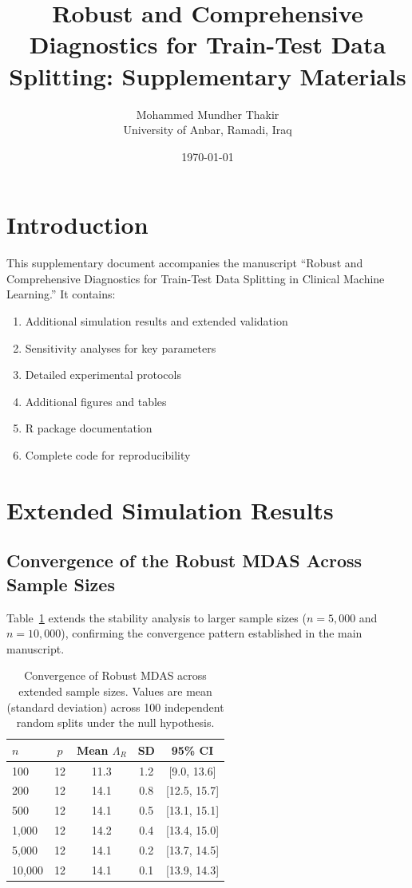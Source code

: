 \documentclass[10pt,a4paper]{article}
\title{Robust and Comprehensive Diagnostics for Train-Test Data Splitting: Supplementary Materials}
\author{Mohammed Mundher Thakir\\ \small{University of Anbar, Ramadi, Iraq}}
\date{\today}
\begin{document}
\maketitle

\tableofcontents

\newpage

\section{Introduction}

This supplementary document accompanies the manuscript ``Robust and Comprehensive Diagnostics for Train-Test Data Splitting in Clinical Machine Learning.'' It contains:

\begin{enumerate}
    \item Additional simulation results and extended validation
    \item Sensitivity analyses for key parameters
    \item Detailed experimental protocols
    \item Additional figures and tables
    \item R package documentation
    \item Complete code for reproducibility
\end{enumerate}

\section{Extended Simulation Results}

\subsection{Convergence of the Robust MDAS Across Sample Sizes}

Table~\ref{tab:convergence} extends the stability analysis to larger sample sizes ($n = 5,000$ and $n = 10,000$), confirming the convergence pattern established in the main manuscript.

\begin{table}[H]
\centering
\caption{Convergence of Robust MDAS across extended sample sizes. Values are mean (standard deviation) across 100 independent random splits under the null hypothesis.}
\label{tab:convergence}
\begin{tabular}{lcccc}
\toprule
$n$ & $p$ & Mean $\Lambda_R$ & SD & 95\% CI \\
\midrule
100 & 12 & 11.3 & 1.2 & [9.0, 13.6] \\
200 & 12 & 14.1 & 0.8 & [12.5, 15.7] \\
500 & 12 & 14.1 & 0.5 & [13.1, 15.1] \\
1,000 & 12 & 14.2 & 0.4 & [13.4, 15.0] \\
5,000 & 12 & 14.1 & 0.2 & [13.7, 14.5] \\
10,000 & 12 & 14.1 & 0.1 & [13.9, 14.3] \\
\bottomrule
\end{tabular}
\end{table}
\end{document}
